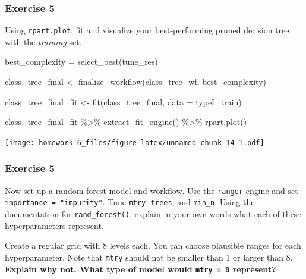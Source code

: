 \documentclass[
]{article}
\newenvironment{Shaded}{\begin{snugshade}}{\end{snugshade}}
\newcommand{\AttributeTok}[1]{\textcolor[rgb]{0.77,0.63,0.00}{#1}}
\newcommand{\FunctionTok}[1]{\textcolor[rgb]{0.00,0.00,0.00}{#1}}
\newcommand{\NormalTok}[1]{#1}
\newcommand{\OtherTok}[1]{\textcolor[rgb]{0.56,0.35,0.01}{#1}}
\newcommand{\SpecialCharTok}[1]{\textcolor[rgb]{0.00,0.00,0.00}{#1}}
\begin{document}
\hypertarget{exercise-5}{%
\subsubsection{Exercise 5}\label{exercise-5}}

Using \texttt{rpart.plot}, fit and visualize your best-performing pruned
decision tree with the \emph{training} set.

\begin{Shaded}
\begin{Highlighting}[]
\NormalTok{best\_complexity }\OtherTok{=} \FunctionTok{select\_best}\NormalTok{(tune\_res)}

\NormalTok{class\_tree\_final }\OtherTok{\textless{}{-}} \FunctionTok{finalize\_workflow}\NormalTok{(class\_tree\_wf, best\_complexity)}

\NormalTok{class\_tree\_final\_fit }\OtherTok{\textless{}{-}} \FunctionTok{fit}\NormalTok{(class\_tree\_final, }\AttributeTok{data =}\NormalTok{ typeI\_train)}
\end{Highlighting}
\end{Shaded}

\begin{Shaded}
\begin{Highlighting}[]
\NormalTok{class\_tree\_final\_fit }\SpecialCharTok{\%\textgreater{}\%}
  \FunctionTok{extract\_fit\_engine}\NormalTok{() }\SpecialCharTok{\%\textgreater{}\%}
  \FunctionTok{rpart.plot}\NormalTok{()}
\end{Highlighting}
\end{Shaded}

\texttt{[image: homework-6\_files/figure-latex/unnamed-chunk-14-1.pdf]}

\hypertarget{exercise-5-1}{%
\subsubsection{Exercise 5}\label{exercise-5-1}}

Now set up a random forest model and workflow. Use the \texttt{ranger}
engine and set \texttt{importance\ =\ "impurity"}. Tune \texttt{mtry},
\texttt{trees}, and \texttt{min\_n}. Using the documentation for
\texttt{rand\_forest()}, explain in your own words what each of these
hyperparameters represent.

Create a regular grid with 8 levels each. You can choose plausible
ranges for each hyperparameter. Note that \texttt{mtry} should not be
smaller than 1 or larger than 8. \textbf{Explain why not. What type of
model would \texttt{mtry\ =\ 8} represent?}
\end{document}
